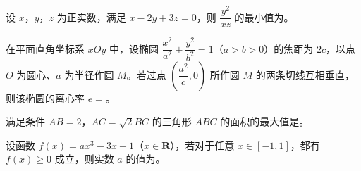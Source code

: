\begin{question}
设 $x$，$y$，$z$ 为正实数，满足 $x-2y+3z=0$，则 $\dfrac{y^2}{xz}$ 的最小值为\gkblank{}。

\end{question}
\begin{question}
在平面直角坐标系 $xOy$ 中，设椭圆 $\dfrac{x^2}{a^2}+\dfrac{y^2}{b^2}=1$（$a>b>0$）的焦距为 $2c$，以点 $O$ 为圆心、$a$ 为半径作圆 $M$。若过点 $\left(\dfrac{a^2}{c},0\right)$ 所作圆 $M$ 的两条切线互相垂直，则该椭圆的离心率 $e=$\gkblank{}。

\end{question}
\begin{question}
满足条件 $AB=2$，$AC=\sqrt2BC$ 的三角形 $ABC$ 的面积的最大值是\gkblank{}。

\end{question}
\begin{question}
设函数 $f(x)=ax^3-3x+1$（$x\in\mathbf R$），若对于任意 $x\in[-1,1]$，都有 $f(x)\geqslant0$ 成立，则实数 $a$ 的值为\gkblank{}。

\end{question}

